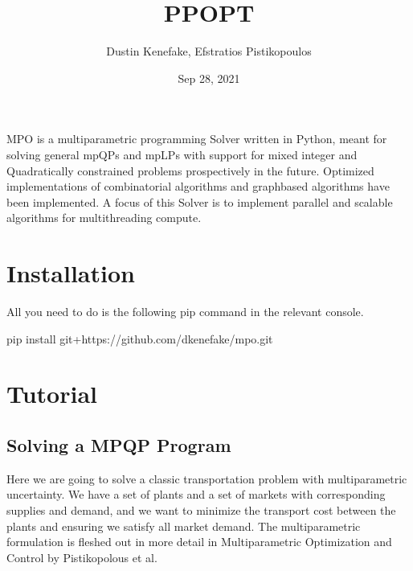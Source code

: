 \documentclass[letterpaper,10pt,english]{sphinxmanual}
\title{PPOPT}
\date{Sep 28, 2021}
\author{Dustin Kenefake, Efstratios Pistikopoulos}
\begin{document}
\pagestyle{empty}
\sphinxmaketitle
\pagestyle{plain}
\sphinxtableofcontents
\pagestyle{normal}
\label{\detokenize{index::doc}}


\sphinxAtStartPar
MPO is a multiparametric programming Solver written in Python, meant for solving general mpQPs and mpLPs with support for mixed integer and Quadratically constrained problems prospectively in the future. Optimized implementations of combinatorial algorithms and graph\sphinxhyphen{}based algorithms have been implemented. A focus of this Solver is to implement parallel and scalable algorithms for multithreading compute.


\chapter{Installation}
\label{\detokenize{index:installation}}
\sphinxAtStartPar
All you need to do is the following pip command in the relevant console.

\begin{sphinxVerbatim}[commandchars=\\\{\}]
pip install git+https://github.com/dkenefake/mpo.git
\end{sphinxVerbatim}


\chapter{Tutorial}
\label{\detokenize{index:tutorial}}

\section{Solving a MPQP Program}
\label{\detokenize{tutorial:solving-a-mpqp-program}}\label{\detokenize{tutorial::doc}}
\sphinxAtStartPar
Here we are going to solve a classic transportation problem with multiparametric uncertainty. We have a set of plants and a set of markets with corresponding supplies and demand, and we want to minimize the transport cost between the plants and ensuring we satisfy all market demand. The multiparametric formulation is fleshed out in more detail in Multiparametric Optimization and Control by Pistikopolous et al.
\end{document}
